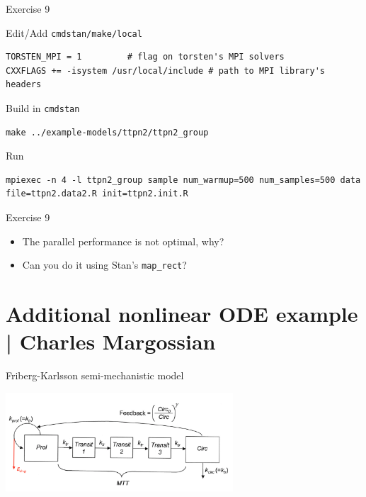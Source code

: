 \documentclass[presentation, allowframebreaks]{beamer}
\begin{document}
\begin{frame}[fragile,label={sec:org0b9039b}]{Exercise 9}
 \begin{block}{Edit/Add \texttt{cmdstan/make/local}}
\begin{verbatim}
TORSTEN_MPI = 1         # flag on torsten's MPI solvers
CXXFLAGS += -isystem /usr/local/include # path to MPI library's headers
\end{verbatim}
\end{block}
\begin{block}{Build in \texttt{cmdstan}}
\begin{verbatim}
make ../example-models/ttpn2/ttpn2_group
\end{verbatim}
\end{block}
\begin{block}{Run}
\begin{verbatim}
mpiexec -n 4 -l ttpn2_group sample num_warmup=500 num_samples=500 data file=ttpn2.data2.R init=ttpn2.init.R
\end{verbatim}
\end{block}
\end{frame}

\begin{frame}[fragile,label={sec:orgf252be1}]{Exercise 9}
 \begin{itemize}
\item The parallel performance is not optimal, why?
\item Can you do it using Stan's \texttt{map\_rect}?
\end{itemize}
\end{frame}

\section{Additional nonlinear ODE example | \footnotesize{Charles Margossian}}
\label{sec:org82b7e7f}
\begin{frame}[label={sec:org441612d}]{Friberg-Karlsson semi-mechanistic model \cite{Friberg:2002}}
\begin{center}
  \includegraphics[width=8.5cm]{Friberg-Karlsson_drug}
\end{center}
\end{frame}
\end{document}
